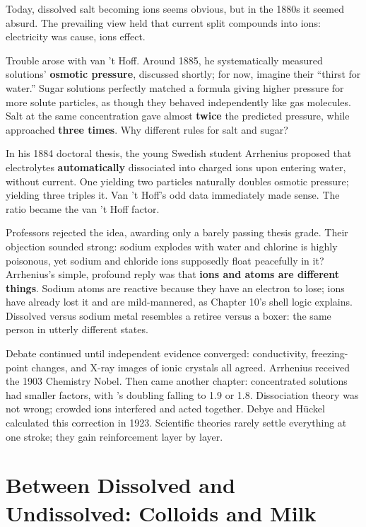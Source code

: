 \begin{zhengju}
Today, dissolved salt becoming ions seems obvious, but in the 1880s it seemed absurd. The prevailing view held that current split compounds into ions: electricity was cause, ions effect.

Trouble arose with van 't Hoff. Around 1885, he systematically measured solutions' \textbf{osmotic pressure}, discussed shortly; for now, imagine their ``thirst for water.'' Sugar solutions perfectly matched a formula giving higher pressure for more solute particles, as though they behaved independently like gas molecules. Salt at the same concentration gave almost \textbf{twice} the predicted pressure, while  approached \textbf{three times}. Why different rules for salt and sugar?

In his 1884 doctoral thesis, the young Swedish student Arrhenius proposed that electrolytes \textbf{automatically} dissociated into charged ions upon entering water, without current. One  yielding two particles naturally doubles osmotic pressure;  yielding three triples it. Van 't Hoff's odd data immediately made sense. The ratio became the van 't Hoff factor.

Professors rejected the idea, awarding only a barely passing thesis grade. Their objection sounded strong: sodium explodes with water and chlorine is highly poisonous, yet sodium and chloride ions supposedly float peacefully in it? Arrhenius's simple, profound reply was that \textbf{ions and atoms are different things}. Sodium atoms are reactive because they have an electron to lose; ions have already lost it and are mild-mannered, as Chapter 10's shell logic explains. Dissolved  versus sodium metal resembles a retiree versus a boxer: the same person in utterly different states.

Debate continued until independent evidence converged: conductivity, freezing-point changes, and X-ray images of ionic crystals all agreed. Arrhenius received the 1903 Chemistry Nobel. Then came another chapter: concentrated solutions had smaller factors, with 's doubling falling to 1.9 or 1.8. Dissociation theory was not wrong; crowded ions interfered and acted together. Debye and H\"uckel calculated this correction in 1923. Scientific theories rarely settle everything at one stroke; they gain reinforcement layer by layer.
\end{zhengju}

\section{Between Dissolved and Undissolved: Colloids and Milk}


